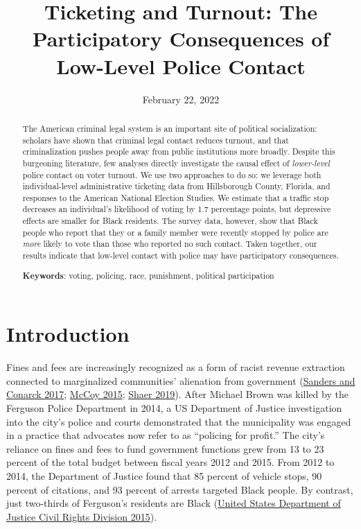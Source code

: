 \documentclass[
  12pt,
]{article}
\title{Ticketing and Turnout: The Participatory Consequences of Low-Level Police Contact}
\author{}
\date{\vspace{-2.5em}February 22, 2022}
\begin{document}
\maketitle
\begin{abstract}
The American criminal legal system is an important site of political socialization: scholars have shown that criminal legal contact reduces turnout, and that criminalization pushes people away from public institutions more broadly. Despite this burgeoning literature, few analyses directly investigate the causal effect of \emph{lower-level} police contact on voter turnout. We use two approaches to do so: we leverage both individual-level administrative ticketing data from Hillsborough County, Florida, and responses to the American National Election Studies. We estimate that a traffic stop decreases an individual's likelihood of voting by 1.7 percentage points, but depressive effects are smaller for Black residents. The survey data, however, show that Black people who report that they or a family member were recently stopped by police are \emph{more} likely to vote than those who reported no such contact. Taken together, our results indicate that low-level contact with police may have participatory consequences.

\hfill\break

\textbf{Keywords}: voting, policing, race, punishment, political participation
\end{abstract}

\pagebreak

\doublespacing

\hypertarget{introduction}{%
\section*{Introduction}\label{introduction}}

Fines and fees are increasingly recognized as a form of racist revenue extraction connected to marginalized communities' alienation from government (\protect\hyperlink{ref-Sanders2017}{Sanders and Conarck 2017}; \protect\hyperlink{ref-McCoy2015}{McCoy 2015}; \protect\hyperlink{ref-Shaer2019}{Shaer 2019}). After Michael Brown was killed by the Ferguson Police Department in 2014, a US Department of Justice investigation into the city's police and courts demonstrated that the municipality was engaged in a practice that advocates now refer to as ``policing for profit.'' The city's reliance on fines and fees to fund government functions grew from 13 to 23 percent of the total budget between fiscal years 2012 and 2015. From 2012 to 2014, the Department of Justice found that 85 percent of vehicle stops, 90 percent of citations, and 93 percent of arrests targeted Black people. By contrast, just two-thirds of Ferguson's residents are Black (\protect\hyperlink{ref-UnitedStatesDepartmentofJusticeCivilRightsDivision2015}{United States Department of Justice Civil Rights Division 2015}).
\end{document}
